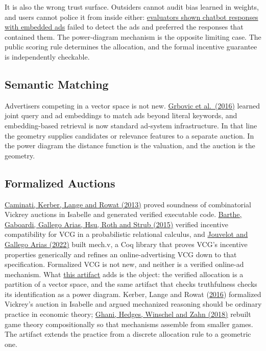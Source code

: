 It is also the wrong trust surface. Outsiders cannot audit bias learned
in weights, and users cannot police it from inside either:
\href{https://arxiv.org/abs/2409.15436}{evaluators shown chatbot
responses with embedded ads} failed to detect the ads and preferred the
responses that contained them. The power-diagram mechanism is the
opposite limiting case. The public scoring rule determines the
allocation, and the formal incentive guarantee is independently
checkable.

\subsection{Semantic Matching}\label{semantic-matching}

Advertisers competing in a vector space is not new.
\href{https://arxiv.org/abs/1607.01869}{Grbovic et al.~(2016)} learned
joint query and ad embeddings to match ads beyond literal keywords, and
embedding-based retrieval is now standard ad-system infrastructure. In
that line the geometry supplies candidates or relevance features to a
separate auction. In the power diagram the distance function is the
valuation, and the auction is the geometry.

\subsection{Formalized Auctions}\label{formalized-auctions}

\href{https://arxiv.org/abs/1308.1779}{Caminati, Kerber, Lange and Rowat
(2013)} proved soundness of combinatorial Vickrey auctions in Isabelle
and generated verified executable code.
\href{https://arxiv.org/abs/1502.04052}{Barthe, Gaboardi, Gallego Arias,
Hsu, Roth and Strub (2015)} verified incentive compatibility for VCG in
a probabilistic relational calculus, and
\href{https://github.com/jouvelot/mech.v}{Jouvelot and Gallego Arias
(2022)} built mech.v, a Coq library that proves VCG's incentive
properties generically and refines an online-advertising VCG down to
that specification. Formalized VCG is not new, and neither is a verified
online-ad mechanism. What \hyperref[formalization]{this artifact} adds
is the object: the verified allocation is a partition of a vector space,
and the same artifact that checks truthfulness checks its identification
as a power diagram. Kerber, Lange and Rowat
(\href{https://doi.org/10.1016/j.jmateco.2016.06.005}{2016}) formalized
Vickrey's auction in Isabelle and argued mechanized reasoning should be
ordinary practice in economic theory;
\href{https://arxiv.org/abs/1603.04641}{Ghani, Hedges, Winschel and Zahn
(2018)} rebuilt game theory compositionally so that mechanisms assemble
from smaller games. The artifact extends the practice from a discrete
allocation rule to a geometric one.

